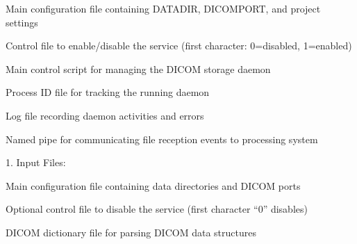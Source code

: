 \documentclass[letterpaper,10pt,english]{sphinxmanual}
\begin{document}
\sphinxAtStartPar
{}


\sphinxAtStartPar
{}

\begin{DUlineblock}{0em}
\item[] \sphinxhyphen{}  \sphinxhyphen{} Main configuration file containing DATADIR, DICOMPORT, and project settings
\item[] \sphinxhyphen{}  \sphinxhyphen{} Control file to enable/disable the service (first character: 0=disabled, 1=enabled)
\item[] \sphinxhyphen{}  \sphinxhyphen{} Main control script for managing the DICOM storage daemon
\item[] \sphinxhyphen{}  \sphinxhyphen{} Process ID file for tracking the running daemon
\item[] \sphinxhyphen{}  \sphinxhyphen{} Log file recording daemon activities and errors
\item[] \sphinxhyphen{}  \sphinxhyphen{} Named pipe for communicating file reception events to processing system
\end{DUlineblock}

\sphinxAtStartPar
{}


\sphinxAtStartPar
{}

\begin{DUlineblock}{0em}
\item[] 1. Input Files:
\end{DUlineblock}

\begin{DUlineblock}{0em}
\item[] \sphinxhyphen{}  \sphinxhyphen{} Main configuration file containing data directories and DICOM ports
\item[] \sphinxhyphen{}  \sphinxhyphen{} Optional control file to disable the service (first character “0” disables)
\item[] \sphinxhyphen{}  \sphinxhyphen{} DICOM dictionary file for parsing DICOM data structures
\end{DUlineblock}
\end{document}

